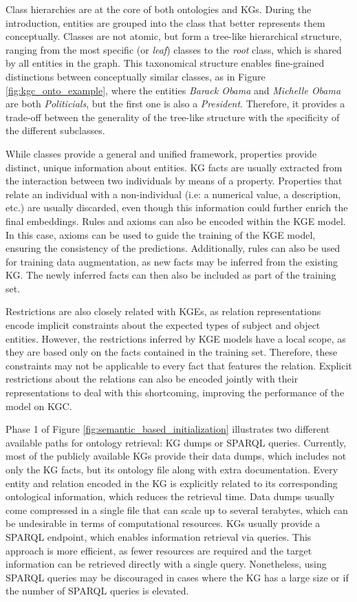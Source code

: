 Class hierarchies are at the core of both ontologies and KGs. During the introduction, entities are grouped into the class that better represents them conceptually. Classes are not atomic, but form a tree-like hierarchical structure, ranging from the most specific (or \textit{leaf}) classes to the \textit{root} class, which is shared by all entities in the graph. This taxonomical structure enables fine-grained distinctions between conceptually similar classes, as in Figure \ref{fig:kgc_onto_example}, where the entities \textit{Barack Obama} and \textit{Michelle Obama} are both \textit{Politicials}, but the first one is also a \textit{President}. Therefore, it provides a trade-off between the generality of the tree-like structure with the specificity of the different subclasses. 

While classes provide a general and unified framework, properties provide distinct, unique information about entities. KG facts are usually extracted from the interaction between two individuals by means of a property. Properties that relate an individual with a non-individual (i.e: a numerical value, a description, etc.) are usually discarded, even though this information could further enrich the final embeddings. Rules and axioms can also be encoded within the KGE model. In this case, axioms can be used to guide the training of the KGE model, ensuring the consistency of the predictions. Additionally, rules can also be used for training data augmentation, as new facts may be inferred from the existing KG. The newly inferred facts can then also be included as part of the training set.

Restrictions are also closely related with KGEs, as relation representations encode implicit constraints about the expected types of subject and object entities. However, the restrictions inferred by KGE models have a local scope, as they are based only on the facts contained in the training set. Therefore, these constraints may not be applicable to every fact that features the relation. Explicit restrictions about the relations can also be encoded jointly with their representations to deal with this shortcoming, improving the performance of the model on KGC.

Phase 1 of Figure \ref{fig:semantic_based_initialization} illustrates two different available paths for ontology retrieval: KG dumps or SPARQL queries. Currently, most of the publicly available KGs provide their data dumps, which includes not only the KG facts, but its ontology file along with extra documentation. Every entity and relation encoded in the KG is explicitly related to its corresponding ontological information, which reduces the retrieval time. Data dumps usually come compressed in a single file that can scale up to several terabytes, which can be undesirable in terms of computational resources. KGs usually provide a SPARQL endpoint, which enables information retrieval via queries. This approach is more efficient, as fewer resources are required and the target information can be retrieved directly with a single query. Nonetheless, using SPARQL queries may be discouraged in cases where the KG has a large size or if the number of SPARQL queries is elevated. 

